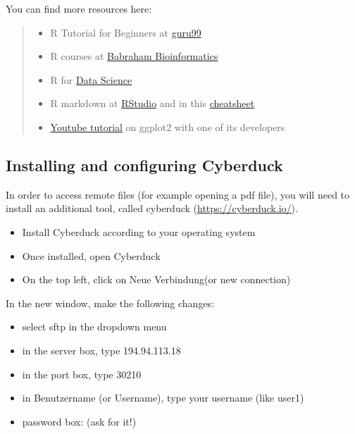 \documentclass[
]{book}
\providecommand{\tightlist}{%
  \setlength{\itemsep}{0pt}\setlength{\parskip}{0pt}}
\begin{document}
You can find more resources here:

\begin{quote}
\begin{itemize}
\tightlist
\item
  R Tutorial for Beginners at \href{https://www.guru99.com/r-tutorial.html}{guru99}
\item
  R courses at \href{https://www.bioinformatics.babraham.ac.uk/training.html\#advancedrtidy}{Babraham Bioinformatics}
\item
  R for \href{https://r4ds.had.co.nz}{Data Science}
\item
  R markdown at \href{https://rmarkdown.rstudio.com/lesson-1.html}{RStudio} and in this \href{https://www.markdownguide.org/cheat-sheet/}{cheatsheet}
\item
  \href{https://www.youtube.com/watch?v=h29g21z0a68}{Youtube tutorial} on ggplot2 with one of its developers
\end{itemize}
\end{quote}

\hypertarget{installing-and-configuring-cyberduck}{%
\subsection*{Installing and configuring Cyberduck}\label{installing-and-configuring-cyberduck}}

In order to access remote files (for example opening a pdf file), you will need to install an additional tool, called cyberduck (\url{https://cyberduck.io/}).

\begin{itemize}
\tightlist
\item
  Install Cyberduck according to your operating system
\item
  Once installed, open Cyberduck
\item
  On the top left, click on Neue Verbindung(or new connection)
\end{itemize}

In the new window, make the following changes:

\begin{itemize}
\tightlist
\item
  select sftp in the dropdown menu
\item
  in the server box, type 194.94.113.18
\item
  in the port box, type 30210
\item
  in Benutzername (or Username), type your username (like user1)
\item
  password box: (ask for it!)
\end{itemize}
\end{document}
